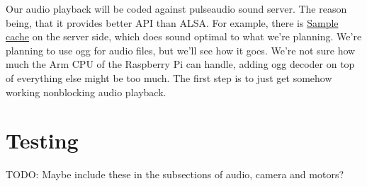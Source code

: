 \documentclass[english,11pt,twoside,a4paper]{article}
\begin{document}
Our audio playback will be coded against pulseaudio sound server. The reason being, that it provides better API than ALSA. For example, there is \href{http://freedesktop.org/software/pulseaudio/doxygen/scache.html}{Sample cache} on the server side, which does sound optimal to what we're planning. We're planning to use ogg for audio files, but we'll see how it goes. We're not sure how much the Arm CPU of the Raspberry Pi can handle, adding ogg decoder on top of everything else might be too much. The first step is to just get somehow working nonblocking audio playback.

\section{Testing}
TODO: Maybe include these in the subsections of audio, camera and motors?
\end{document}
